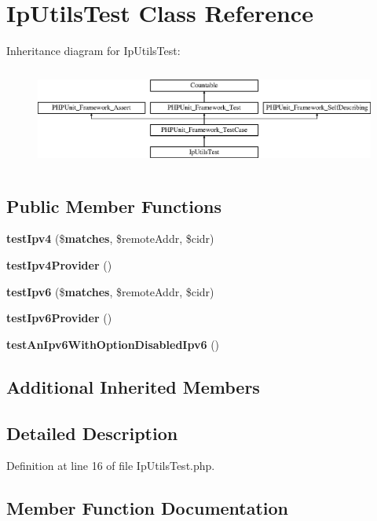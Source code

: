 \section{Ip\+Utils\+Test Class Reference}
\label{class_symfony_1_1_component_1_1_http_foundation_1_1_tests_1_1_ip_utils_test}
Inheritance diagram for Ip\+Utils\+Test\+:\begin{figure}[H]
\begin{center}
\leavevmode
\includegraphics[height=3.303835cm]{class_symfony_1_1_component_1_1_http_foundation_1_1_tests_1_1_ip_utils_test}
\end{center}
\end{figure}
\subsection*{Public Member Functions}
\begin{DoxyCompactItemize}
\item 
{\bf test\+Ipv4} (\${\bf matches}, \$remote\+Addr, \$cidr)
\item 
{\bf test\+Ipv4\+Provider} ()
\item 
{\bf test\+Ipv6} (\${\bf matches}, \$remote\+Addr, \$cidr)
\item 
{\bf test\+Ipv6\+Provider} ()
\item 
{\bf test\+An\+Ipv6\+With\+Option\+Disabled\+Ipv6} ()
\end{DoxyCompactItemize}
\subsection*{Additional Inherited Members}


\subsection{Detailed Description}


Definition at line 16 of file Ip\+Utils\+Test.\+php.



\subsection{Member Function Documentation}
